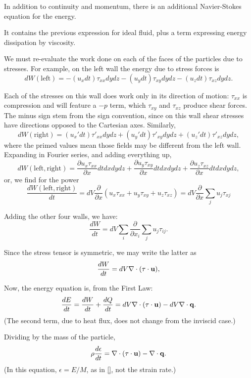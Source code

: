 In addition to continuity and momentum, there is an additional
Navier-Stokes equation for the energy.

It contains the previous expression for ideal fluid, plus a term
expressing energy dissipation by viscosity.

We must re-evaluate the work done on each of the faces of the
particles due to stresses. For example, on the left wall the energy
due to stress forces is
\[
dW(\mathrm{left})  =
 -(u_x dt)   \tau_{xx} dy dz
 -(u_y dt)   \tau_{xy} dy dz
 -(u_z dt)   \tau_{xz} dy dz .
\]

Each of the stresses on this wall does work only in its direction of
motion: $\tau_{xx}$ is compression and will feature a $-p$ term, which
$\tau_{xy}$ and $\tau_{xz}$ produce shear forces. The minus sign stem from
the sign convention, since on this wall shear stresses have directions
opposed to the Cartesian axes. Similarly,
\[
dW(\mathrm{right})  =
 (u_x' dt)   \tau'_{xx}  dy dz
+(u_y' dt)   \tau'_{xy} dy dz
+(u_z' dt)   \tau'_{xz} dy dz ,
\]
where the primed values mean those fields may be different from the
left wall. Expanding in Fourier series, and adding everything up,
\[
dW(\mathrm{left,right})  =
 \frac{\partial u_x \tau_{xx}}{\partial x}  dt dx  dy dz  +
 \frac{\partial u_y \tau_{xy}}{\partial x}  dt dx  dy dz  +
 \frac{\partial u_z \tau_{xz}}{\partial x}  dt dx  dy dz ,
 \]
or, we find for the power
\[
\frac{dW(\mathrm{left,right})}{dt}  =
dV 
\frac{\partial }{\partial x}
\left(
 u_x \tau_{xx} +
 u_y \tau_{xy} +
 u_z \tau_{xz}
 \right) =
dV 
\frac{\partial }{\partial x}
\sum_j u_j \tau_{xj}
\]

Adding the other four walls, we have:
\[
\frac{dW}{dt}  =
dV
 \sum_i \frac{\partial }{\partial x_i} \sum_j u_j \tau_{ij} .
\]

Since the stress tensor is symmetric, we may write the latter as
\[
\frac{dW}{dt}  =
dV
\nabla\cdot ( \tau \cdot  \mathbf{u} ) ,
\]

Now, the energy equation is, from the First Law:
\[
\frac{dE}{dt}  = \frac{dW}{dt} + \frac{dQ}{dt} =
dV \nabla\cdot ( \tau \cdot  \mathbf{u} ) - dV\nabla\cdot\mathbf{q} .
\]
(The second term, due to heat flux, does not change from the inviscid
case.)

Dividing by the mass of the particle,
\begin{equation}
\label{eq:NS_en_2}
\rho \frac{d \epsilon }{dt}  = 
 \nabla\cdot ( \tau \cdot  \mathbf{u} ) - \nabla\cdot\mathbf{q} .
\end{equation}
(In this equation, $\epsilon=E/M$, as in \ref{}, not the strain rate.)

